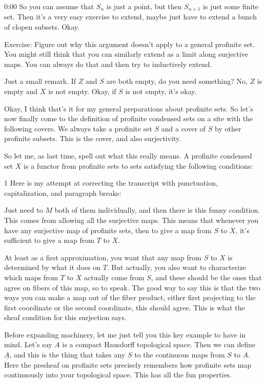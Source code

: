 \begin{unfinished}{0:00}
So you can assume that $S_n$ is just a point, but then $S_{n+1}$ is just some finite set. Then it's a very easy exercise to extend, maybe just have to extend a bunch of clopen subsets. Okay.

Exercise: Figure out why this argument doesn't apply to a general profinite set. You might still think that you can similarly extend as a limit along surjective maps. You can always do that and then try to inductively extend.

Just a small remark. If $Z$ and $S$ are both empty, do you need something? No, $Z$ is empty and $X$ is not empty. Okay, if $S$ is not empty, it's okay.

Okay, I think that's it for my general preparations about profinite sets. So let's now finally come to the definition of profinite condensed sets on a site with the following covers. We always take a profinite set $S$ and a cover of $S$ by other profinite subsets. This is the cover, and also surjectivity.

So let me, as last time, spell out what this really means. A profinite condensed set $X$ is a functor from profinite sets to sets satisfying the following conditions:

1
Here is my attempt at correcting the transcript with punctuation, capitalization, and paragraph breaks:

Just need to $M$ both of them individually, and then there is this funny condition. This comes from allowing all the surjective maps. This means that whenever you have any surjective map of profinite sets, then to give a map from $S$ to $X$, it's sufficient to give a map from $T$ to $X$. 

At least as a first approximation, you want that any map from $S$ to $X$ is determined by what it does on $T$. But actually, you also want to characterize which maps from $T$ to $X$ actually come from $S$, and these should be the ones that agree on fibers of this map, so to speak. The good way to say this is that the two ways you can make a map out of the fiber product, either first projecting to the first coordinate or the second coordinate, this should agree. This is what the sheaf condition for this surjection says.

Before expanding machinery, let me just tell you this key example to have in mind. Let's say $A$ is a compact Hausdorff topological space. Then we can define $\underline{A}$, and this is the thing that takes any $S$ to the continuous maps from $S$ to $A$. Here the presheaf on profinite sets precisely remembers how profinite sets map continuously into your topological space. This has all the fun properties.


\end{unfinished}

